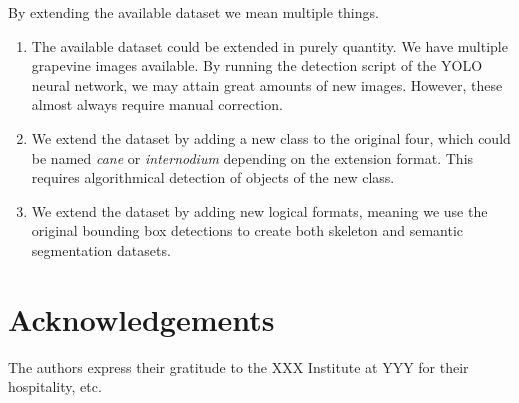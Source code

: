 \documentclass{PSAIE}%
\begin{document}
By extending the available dataset we mean multiple things.
\begin{enumerate}
    \item The available dataset could be extended in purely quantity. We have multiple grapevine images
          available. By running the detection script of the YOLO neural network, we may attain great amounts of
          new images. However, these almost always require manual correction.
    \item We extend the dataset by adding a new class to the original four, which could be named \textit{cane}
          or \textit{internodium} depending on the extension format. This requires algorithmical detection of
          objects of the new class.
    \item We extend the dataset by adding new logical formats, meaning we use the original bounding box
          detections to create both skeleton and semantic segmentation datasets.
\end{enumerate}


\section*{Acknowledgements}
\noindent
The authors express their gratitude to the XXX Institute at YYY for
their hospitality, etc.



\end{document}
